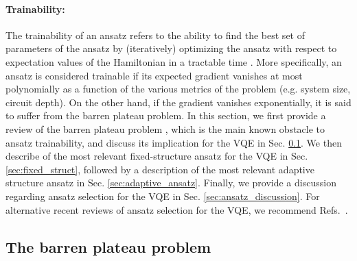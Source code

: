 \paragraph{Trainability:} The trainability of an ansatz refers to the ability to find the best set of parameters of the ansatz by (iteratively) optimizing the ansatz with respect to expectation values of the Hamiltonian in a tractable time \cite{Cerezo2021_BP, Holmes2021}.
More specifically, an ansatz is considered trainable if its expected gradient vanishes at most polynomially as a function of the various metrics of the problem (e.g. system size, circuit depth). On the other hand, if the gradient vanishes exponentially, it is said to suffer from the barren plateau problem. 
In this section, we first provide a review of the barren plateau problem \cite{McClean2018}, which is the main known obstacle to ansatz trainability, and discuss its implication for the VQE in Sec. \ref{sec:barren_plateau}. We then describe of the most relevant fixed-structure ansatz for the VQE in Sec. \ref{sec:fixed_struct}, followed by a description of the most relevant adaptive structure ansatz in Sec. \ref{sec:adaptive_ansatz}. Finally, we provide a discussion regarding ansatz selection for the VQE in Sec. \ref{sec:ansatz_discussion}. For alternative recent reviews of ansatz selection for the VQE, we recommend Refs.~\cite{Fedorov2021, Anand2021_review}.

\subsection{The barren plateau problem} \label{sec:barren_plateau}

